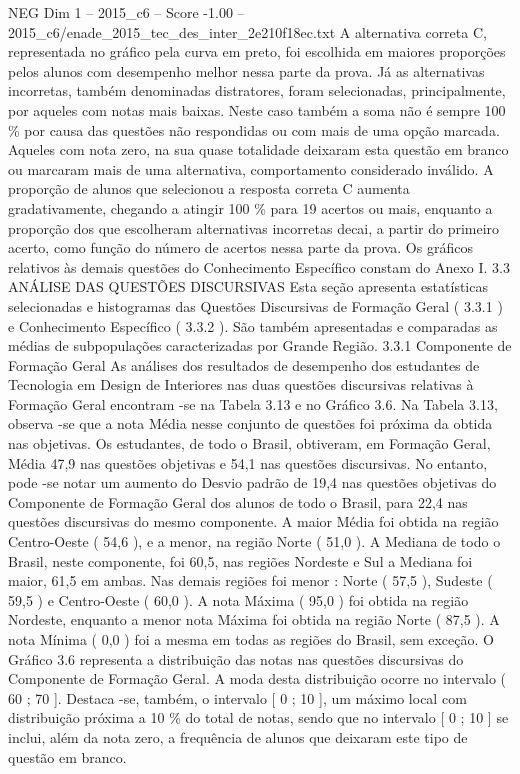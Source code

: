 \begin{textsample}{NEG Dim 1 – 2015\_c6 – Score -1.00 – 2015\_c6/enade\_2015\_tec\_des\_inter\_2e210f18ec.txt}
A alternativa correta C, representada no gráfico pela curva em preto, foi escolhida em maiores proporções pelos alunos com desempenho melhor nessa parte da prova.
Já as alternativas incorretas, também denominadas distratores, foram selecionadas, principalmente, por aqueles com notas mais baixas.
Neste caso também a soma não é sempre 100 \% por causa das questões não respondidas ou com mais de uma opção marcada.
Aqueles com nota zero, na sua quase totalidade deixaram esta questão em branco ou marcaram mais de uma alternativa, comportamento considerado inválido.
A proporção de alunos que selecionou a resposta correta C aumenta gradativamente, chegando a atingir 100 \% para 19 acertos ou mais, enquanto a proporção dos que escolheram alternativas incorretas decai, a partir do primeiro acerto, como função do número de acertos nessa parte da prova.
Os gráficos relativos às demais questões do Conhecimento Específico constam do Anexo I. 3.3 ANÁLISE DAS QUESTÕES DISCURSIVAS Esta seção apresenta estatísticas selecionadas e histogramas das Questões Discursivas de Formação Geral ( 3.3.1 ) e Conhecimento Específico ( 3.3.2 ).
São também apresentadas e comparadas as médias de subpopulações caracterizadas por Grande Região. 3.3.1 Componente de Formação Geral As análises dos resultados de desempenho dos estudantes de Tecnologia em Design de Interiores nas duas questões discursivas relativas à Formação Geral encontram -se na Tabela 3.13 e no Gráfico 3.6.
Na Tabela 3.13, observa -se que a nota Média nesse conjunto de questões foi próxima da obtida nas objetivas.
Os estudantes, de todo o Brasil, obtiveram, em Formação Geral, Média 47,9 nas questões objetivas e 54,1 nas questões discursivas.
No entanto, pode -se notar um aumento do Desvio padrão de 19,4 nas questões objetivas do Componente de Formação Geral dos alunos de todo o Brasil, para 22,4 nas questões discursivas do mesmo componente.
A maior Média foi obtida na região Centro-Oeste ( 54,6 ), e a menor, na região Norte ( 51,0 ).
A Mediana de todo o Brasil, neste componente, foi 60,5, nas regiões Nordeste e Sul a Mediana foi maior, 61,5 em ambas.
Nas demais regiões foi menor : Norte ( 57,5 ), Sudeste ( 59,5 ) e Centro-Oeste ( 60,0 ).
A nota Máxima ( 95,0 ) foi obtida na região Nordeste, enquanto a menor nota Máxima foi obtida na região Norte ( 87,5 ).
A nota Mínima ( 0,0 ) foi a mesma em todas as regiões do Brasil, sem exceção.
O Gráfico 3.6 representa a distribuição das notas nas questões discursivas do Componente de Formação Geral.
A moda desta distribuição ocorre no intervalo ( 60 ; 70 ].
Destaca -se, também, o intervalo [ 0 ; 10 ], um máximo local com distribuição próxima a 10 \% do total de notas, sendo que no intervalo [ 0 ; 10 ] se inclui, além da nota zero, a frequência de alunos que deixaram este tipo de questão em branco.

\end{textsample}
